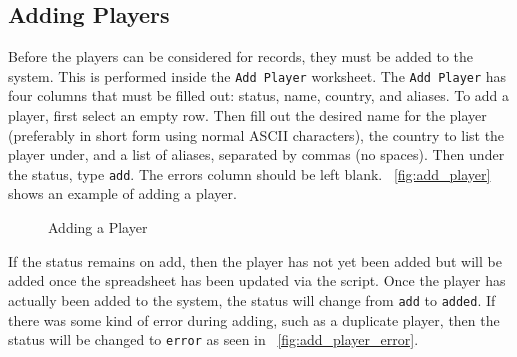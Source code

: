 \subsection{Adding Players}
Before the players can be considered for records, they must be added to the system. This is performed inside the \texttt{Add Player} worksheet. The \texttt{Add Player} has four columns that must be filled out: status, name, country, and aliases.  To add a player, first select an empty row. Then fill out the desired name for the player (preferably in short form using normal ASCII characters), the country to list the player under, and a list of aliases, separated by commas (no spaces). Then under the status, type \texttt{add}. The errors column should be left blank. \figurename\ \ref{fig:add_player} shows an example of adding a player.
\begin{figure}[htb!]
\centering
{}
\caption{Adding a Player}
\end{figure}

If the status remains on add, then the player has not yet been added but will be added once the spreadsheet has been updated via the script. Once the player has actually been added to the system, the status will change from \texttt{add} to \texttt{added}. If there was some kind of error during adding, such as a duplicate player, then the status will be changed to \texttt{error} as seen in \figurename\ \ref{fig:add_player_error}.

